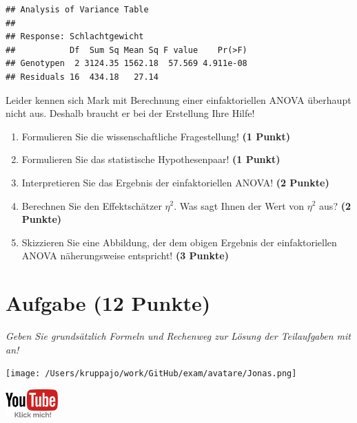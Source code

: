\documentclass[a4paper, 9pt]{scrartcl}\usepackage[]{graphicx}\usepackage[]{xcolor}
\makeatletter
\newenvironment{kframe}{%
 \def\at@end@of@kframe{}%
 \ifinner\ifhmode%
  \def\at@end@of@kframe{\end{minipage}}%
  \begin{minipage}{\columnwidth}%
 \fi\fi%
 \def\FrameCommand##1{\hskip\@totalleftmargin \hskip-\fboxsep
 \colorbox{shadecolor}{##1}\hskip-\fboxsep
     \hskip-\linewidth \hskip-\@totalleftmargin \hskip\columnwidth}%
 \MakeFramed {\advance\hsize-\width
   \@totalleftmargin\z@ \linewidth\hsize
   \@setminipage}}%
 {\par\unskip\endMakeFramed%
 \at@end@of@kframe}
\newenvironment{knitrout}{}{} %
\makeatother
\begin{document}
\begin{knitrout}
\color{fgcolor}\begin{kframe}
\begin{verbatim}
## Analysis of Variance Table
## 
## Response: Schlachtgewicht
##           Df  Sum Sq Mean Sq F value    Pr(>F)
## Genotypen  2 3124.35 1562.18  57.569 4.911e-08
## Residuals 16  434.18   27.14
\end{verbatim}
\end{kframe}
\end{knitrout}

\vspace{1ex}

Leider kennen sich Mark mit Berechnung einer einfaktoriellen ANOVA überhaupt nicht aus. Deshalb braucht er bei der Erstellung Ihre Hilfe! 

\begin{enumerate}
  \item Formulieren Sie die wissenschaftliche Fragestellung! \textbf{(1 Punkt)}
  \item Formulieren Sie das statistische Hypothesenpaar! \textbf{(1 Punkt)}
\item Interpretieren Sie das Ergebnis der einfaktoriellen ANOVA! \textbf{(2 Punkte)} 
\item Berechnen Sie den Effektschätzer $\eta^2$. Was sagt Ihnen der Wert von $\eta^2$ aus? \textbf{(2 Punkte)}
\item Skizzieren Sie eine Abbildung, der dem obigen Ergebnis der
  einfaktoriellen ANOVA näherungsweise entspricht! \textbf{(3 Punkte)}
\end{enumerate}

 
\clearpage

\section{Aufgabe \hfill (12 Punkte)}

\textit{Geben Sie grundsätzlich Formeln und Rechenweg zur Lösung der Teilaufgaben mit an!} \\[1Ex]
 

 
\begin{minipage}[t]{0.5\textwidth}
\texttt{[image: /Users/kruppajo/work/GitHub/exam/avatare/Jonas.png]}
\end{minipage}
\begin{minipage}[t]{0.5\textwidth}
\hfill
\href{https://youtu.be/8Pb2sKUIMyk}{\includegraphics[width = 2cm]{img/youtube}}
\end{minipage}
\vspace{-3Ex}
\end{document}
